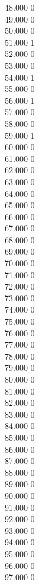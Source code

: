 { 48.000	0 \\
 49.000	0 \\
 50.000	0 \\
 51.000	1 \\
 52.000	0 \\
 53.000	0 \\
 54.000	1 \\
 55.000	0 \\
 56.000	1 \\
 57.000	0 \\
 58.000	0 \\
 59.000	1 \\
 60.000	0 \\
 61.000	0 \\
 62.000	0 \\
 63.000	0 \\
 64.000	0 \\
 65.000	0 \\
 66.000	0 \\
 67.000	0 \\
 68.000	0 \\
 69.000	0 \\
 70.000	0 \\
 71.000	0 \\
 72.000	0 \\
 73.000	0 \\
 74.000	0 \\
 75.000	0 \\
 76.000	0 \\
 77.000	0 \\
 78.000	0 \\
 79.000	0 \\
 80.000	0 \\
 81.000	0 \\
 82.000	0 \\
 83.000	0 \\
 84.000	0 \\
 85.000	0 \\
 86.000	0 \\
 87.000	0 \\
 88.000	0 \\
 89.000	0 \\
 90.000	0 \\
 91.000	0 \\
 92.000	0 \\
 93.000	0 \\
 94.000	0 \\
 95.000	0 \\
 96.000	0 \\
 97.000	0 \\
}
